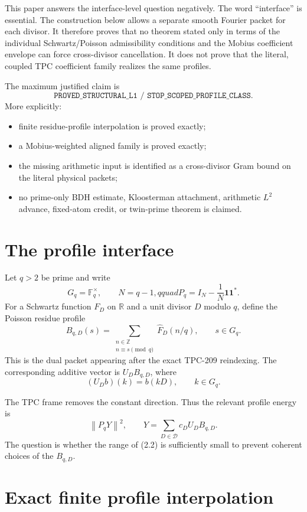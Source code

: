 \documentclass[11pt]{article}
\newcommand{\Fq}{\mathbb F_q}
\newcommand{\Z}{\mathbb Z}
\newcommand{\one}{\mathbf 1}
\newcommand{\Gq}{G_q}
\newcommand{\cD}{\mathcal D}
\newcommand{\norm}[1]{\left\lVert #1\right\rVert}
\begin{document}
This paper answers the interface-level question negatively.  The word
``interface'' is essential.  The construction below allows a separate smooth
Fourier packet for each divisor.  It therefore proves that no theorem stated
only in terms of the individual Schwartz/Poisson admissibility conditions and
the Mobius coefficient envelope can force cross-divisor cancellation.  It does
not prove that the literal, coupled TPC coefficient family realizes the same
profiles.

The maximum justified claim is
\[
\boxed{\texttt{PROVED\_STRUCTURAL\_L1 / STOP\_SCOPED\_PROFILE\_CLASS}.}
\]
More explicitly:
\begin{itemize}[leftmargin=2em]
  \item finite residue-profile interpolation is proved exactly;
  \item a Mobius-weighted aligned family is proved exactly;
  \item the missing arithmetic input is identified as a cross-divisor Gram
        bound on the literal physical packets;
  \item no prime-only BDH estimate, Kloosterman attachment, arithmetic $L^2$
        advance, fixed-atom credit, or twin-prime theorem is claimed.
\end{itemize}

\section{The profile interface}

Let $q>2$ be prime and write
\[
 \Gq=\Fq^\times,\qquad N=q-1,qquad
 P_q=I_N-\frac1N\one\one^*.
 \tag{2.1}
\]
For a Schwartz function $F_D$ on $\mathbb R$ and a unit divisor $D$ modulo
$q$, define the Poisson residue profile
\[
 B_{q,D}(s)=
 \sum_{\substack{n\in\Z\\ n\equiv s\pmod q}}
 \widehat F_D(n/q),
 \qquad s\in\Gq.
 \tag{2.2}
\]
This is the dual packet appearing after the exact TPC-209 reindexing.  The
corresponding additive vector is $U_DB_{q,D}$, where
\[
 (U_D b)(k)=b(kD),\qquad k\in\Gq.
 \tag{2.3}
\]

The TPC frame removes the constant direction.  Thus the relevant profile
energy is
\[
 \norm{P_qY}^2,
 \qquad Y=\sum_{D\in\cD}c_DU_DB_{q,D}.
 \tag{2.4}
\]
The question is whether the range of (2.2) is sufficiently small to prevent
coherent choices of the $B_{q,D}$.

\section{Exact finite profile interpolation}
\end{document}
